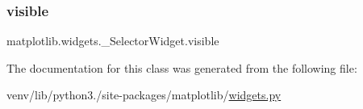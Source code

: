\subsubsection{\texorpdfstring{visible}{visible}}
{\footnotesize\ttfamily matplotlib.\+widgets.\+\_\+\+Selector\+Widget.\+visible}



The documentation for this class was generated from the following file\+:\begin{DoxyCompactItemize}
\item 
venv/lib/python3./site-\/packages/matplotlib/\hyperlink{widgets_8py}{widgets.\+py}\end{DoxyCompactItemize}
